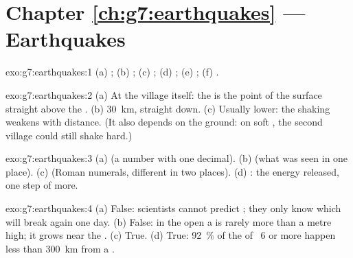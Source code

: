 \section*{Chapter \ref{ch:g7:earthquakes} --- Earthquakes}

\begin{solution}{exo:g7:earthquakes:1}
(a) ; (b) ; (c) ; (d) ; (e) ; (f)
.
\end{solution}

\begin{solution}{exo:g7:earthquakes:2}
(a) At the village itself: the  is the point of the surface
straight above the . (b) \qty{30}{km}, straight down. (c) Usually
lower: the shaking weakens with distance. (It also depends on the ground:
on soft , the second village could still shake hard.)
\end{solution}

\begin{solution}{exo:g7:earthquakes:3}
(a)  (a number with one decimal). (b)  (what was seen
in one place). (c)  (Roman numerals, different in two places).
(d) : the energy released, one step of  more.
\end{solution}

\begin{solution}{exo:g7:earthquakes:4}
(a) False: scientists cannot predict ; they only know which
 will break again one day. (b) False: in the open  a 
is rarely more than a metre high; it grows near the . (c) True. (d)
True: 92~\% of the  of ~6 or more happen less than
\qty{300}{km} from a .
\end{solution}

